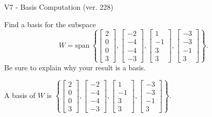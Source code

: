 \begin{exercise}
  \begin{exerciseTitle}V7 - Basis Computation (ver. 228)\end{exerciseTitle}
  \begin{exerciseStatement}
    Find a basis for the subspace 
\[W=\mathrm{span}\ \left\{\left[\begin{array}{r}
2 \\
0 \\
0 \\
3
\end{array}\right] , \left[\begin{array}{r}
-2 \\
-4 \\
-4 \\
-3
\end{array}\right] , \left[\begin{array}{r}
1 \\
-1 \\
3 \\
3
\end{array}\right] , \left[\begin{array}{r}
-3 \\
-3 \\
-1 \\
3
\end{array}\right]\right\}.\]
 Be sure to explain why your result is a basis.


  \end{exerciseStatement}
  \begin{exerciseAnswer}
   A basis of \(W\) is  \(\left\{\left[\begin{array}{r}
2 \\
0 \\
0 \\
3
\end{array}\right] , \left[\begin{array}{r}
-2 \\
-4 \\
-4 \\
-3
\end{array}\right] , \left[\begin{array}{r}
1 \\
-1 \\
3 \\
3
\end{array}\right] , \left[\begin{array}{r}
-3 \\
-3 \\
-1 \\
3
\end{array}\right]\right\}\).
  


  \end{exerciseAnswer}
\end{exercise}